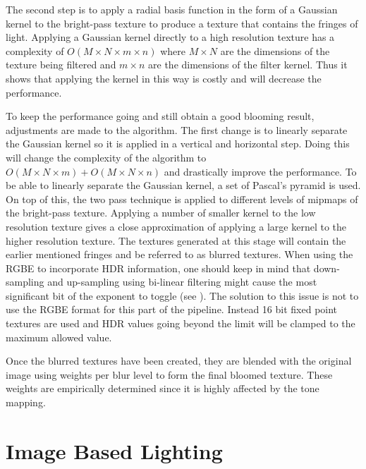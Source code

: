 \documentclass[twocolumn,8pt]{article}
\begin{document}
The second step is to apply a radial basis function in the form of a Gaussian kernel to the bright-pass texture to produce a texture that contains the fringes of light. Applying a Gaussian kernel directly to a high resolution texture has a complexity of $O \left ( M \times N \times m \times n  \right )$ where $M \times N$ are the dimensions of the texture being filtered and $m \times n$ are the dimensions of the filter kernel. Thus it shows that applying the kernel in this way is costly and will decrease the performance. 

To keep the performance going and still obtain a good blooming result, adjustments are made to the algorithm. The first change is to linearly separate the Gaussian kernel so it is applied in a vertical and horizontal step. Doing this will change the complexity of the algorithm to $O \left ( M \times N \times m  \right ) + O \left ( M \times N \times n  \right )$ and drastically improve the performance. To be able to linearly separate the Gaussian kernel, a set of Pascal's pyramid is used. On top of this, the two pass technique is applied to different levels of mipmaps of the bright-pass texture. Applying a number of smaller kernel to the low resolution texture gives a close approximation of applying a large kernel to the higher resolution texture. The textures generated at this stage will contain the earlier mentioned fringes and be referred to as blurred textures. When using the RGBE to incorporate HDR information, one should keep in mind that down-sampling and up-sampling using bi-linear filtering might cause the most significant bit of the exponent to toggle (see \cite{hdrTexturing}). The solution to this issue is not to use the RGBE format for this part of the pipeline. Instead 16 bit fixed point textures are used and HDR values going beyond the limit will be clamped to the maximum allowed value.

Once the blurred textures have been created, they are blended with the original image using weights per blur level to form the final bloomed texture. These weights are empirically determined since it is highly affected by the tone mapping. 

\section{Image Based Lighting}
\end{document}
